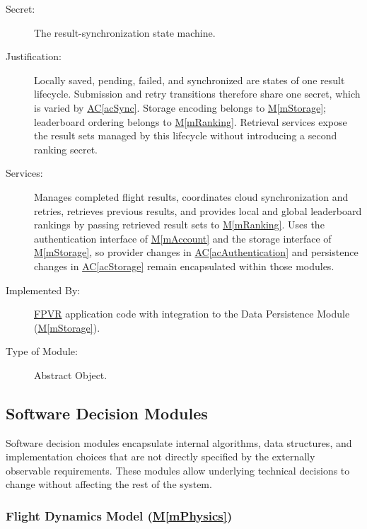 \documentclass[12pt, titlepage]{article}
\DeclareRobustCommand{\mgabbr}[2]{\hyperlink{mg-abbr:#1}{#2}}
\newcommand{\acref}[1]{\mgabbr{ac}{AC}\ref{#1}}
\newcommand{\mref}[1]{\hyperref[#1]{M\ref*{#1}}}
\begin{document}
\begin{description}

\item[Secret:]
The result-synchronization state machine.

\item[Justification:]
Locally saved, pending, failed, and synchronized are states of one result
lifecycle. Submission and retry transitions therefore share one secret,
which is varied by \acref{acSync}.
Storage encoding belongs to \mref{mStorage}; leaderboard ordering belongs
to \mref{mRanking}. Retrieval services expose the result sets managed by
this lifecycle without introducing a second ranking secret.

\item[Services:]
Manages completed flight results, coordinates cloud
synchronization and retries, retrieves previous
results, and provides local and global leaderboard
rankings by passing retrieved result sets to \mref{mRanking}.
Uses the authentication
interface of \mref{mAccount} and the storage interface of
\mref{mStorage}, so provider changes in \acref{acAuthentication}
and persistence changes in \acref{acStorage} remain encapsulated
within those modules.

\item[Implemented By:]
\mgabbr{fpvr}{FPVR} application code with integration to the
Data Persistence Module (\mref{mStorage}).

\item[Type of Module:]
Abstract Object.

\end{description}


\subsection{Software Decision Modules}

Software decision modules encapsulate internal algorithms,
data structures, and implementation choices that are not
directly specified by the externally observable requirements.
These modules allow underlying technical decisions to change
without affecting the rest of the system.


\subsubsection{Flight Dynamics Model (\mref{mPhysics})}
\end{document}
